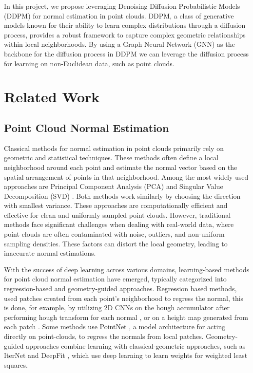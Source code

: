 \documentclass{acmart}
\newcommand{\instructions}[1]{\textcolor{red}{#1}\newline}
\renewcommand{\instructions}[1]{}    %
\begin{document}
In this project, we propose leveraging Denoising Diffusion Probabilistic Models (DDPM) \cite{ho2020denoising} for normal estimation in point clouds. DDPM, a class of generative models known for their ability to learn complex distributions through a diffusion process, provides a robust framework to capture complex geometric relationships within local neighborhoods. By using a Graph Neural Network (GNN) as the backbone for the diffusion process in DDPM we can leverage the diffusion process for learning on non-Euclidean data, such as point clouds.

\section{Related Work}
\instructions{Literature review of related works, e.g. if you only focus on MPGNNs : Message-Passing graph neural network are a popular class of neural networks which...\cite{morris2021weisfeiler} - 0.5-1 page}
\subsection{Point Cloud Normal Estimation}
Classical methods for normal estimation in point clouds primarily rely on geometric and statistical techniques. These methods often define a local neighborhood around each point and estimate the normal vector based on the spatial arrangement of points in that neighborhood. Among the most widely used approaches are Principal Component Analysis (PCA) \cite{hoppe1992surface} and Singular Value Decomposition (SVD) \cite{pauly2002efficient}.
Both methods work similarly by choosing the direction with smallest variance. These approaches are computationally efficient and effective for clean and uniformly sampled point clouds.
However, traditional methods face significant challenges when dealing with real-world data, where point clouds are often contaminated with noise, outliers, and non-uniform sampling densities. These factors can distort the local geometry, leading to inaccurate normal estimations.

With the success of deep learning across various domains, learning-based methods for point cloud normal estimation have emerged, typically categorized into regression-based and geometry-guided approaches.
Regression based methods, used patches created from each point's neighborhood to regress the normal, this is done, for example, by utilizing 2D CNNs on the hough accumulator after performing hough transform for each normal \cite{boulch2016deep}, or on a height map generated from each patch \cite{roveri2018pointpronets,zhou2022refine}. Some methods \cite{guerrero2018pcpnet,sharma2021point} use PointNet \cite{qi2017pointnet}, a model architecture for acting directly on point-clouds, to regress the normals from local patches. Geometry-guided approaches combine learning with classical-geometric approaches, such as IterNet \cite{lenssen2020deep} and DeepFit \cite{ben2020deepfit}, which use deep learning to learn weights for weighted least squares.
\end{document}
